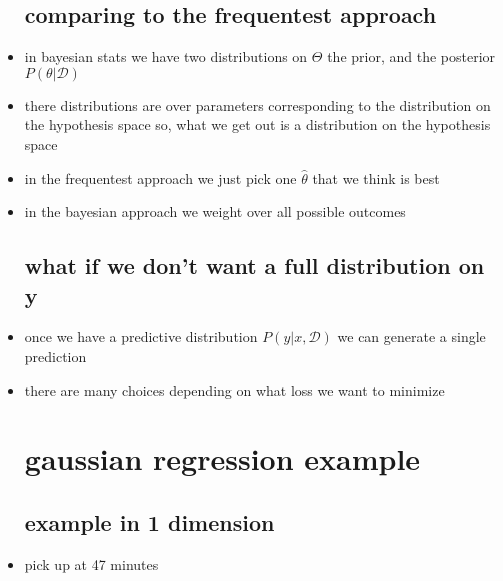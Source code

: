 \documentclass{article}
\begin{document}
\begin{itemize}
\subsection*{comparing to the frequentest approach}
\item in bayesian stats we have two distributions on $\Theta$ the prior, and the posterior $P(\theta|\mathcal{D})$
\item there distributions are over parameters corresponding to the distribution on the hypothesis space so, what we get out is a distribution on the hypothesis space
\item in the frequentest approach we just pick one $\hat{\theta}$ that we think is best 
\item in the bayesian approach we weight over all possible outcomes 
\subsection*{what if we don't want a full distribution on y }
\item once we have a predictive distribution $P(y|x,\mathcal{D})$ we can generate a single prediction
\item there are many choices depending on what loss we want to minimize
\section*{gaussian regression example}
\subsection*{example in 1 dimension}
\item pick up at 47 minutes 
\end{itemize}
\end{document}
